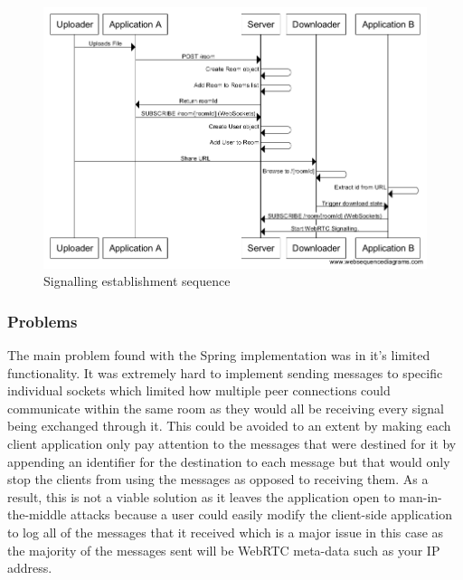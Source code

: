 \documentclass[]{report}
\begin{document}
				\begin{figure}[H]
					\caption{Signalling establishment sequence}
					\centering
					\includegraphics[scale=0.5]{signalling-establishment-sequence.png}
				\end{figure}
							
				\subsubsection*{Problems}
				The main problem found with the Spring implementation was in it's limited functionality. It was extremely hard to implement sending messages to specific individual sockets which limited how multiple peer connections could communicate within the same room as they would all be receiving every signal being exchanged through it. This could be avoided to an extent by making each client application only pay attention to the messages that were destined for it by appending an identifier for the destination to each message but that would only stop the clients from using the messages as opposed to receiving them. As a result, this is not a viable solution as it leaves the application open to man-in- the-middle attacks because a user could easily modify the client-side application to log all of the messages that it received which is a major issue in this case as the majority of the messages sent will be WebRTC meta-data such as your IP address.
				
\end{document}
